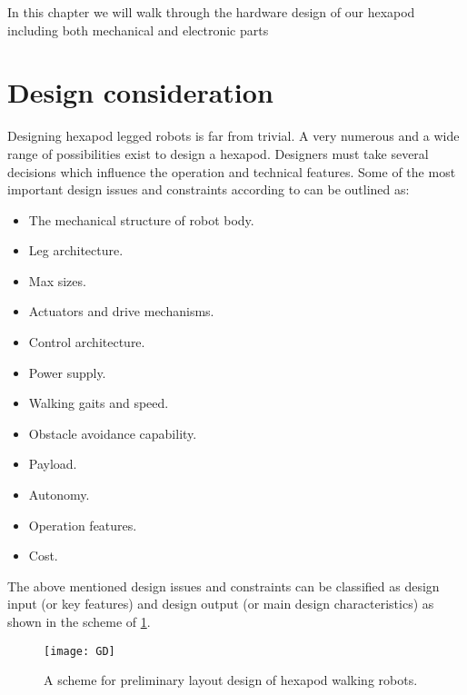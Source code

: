 
In this chapter we will walk through the hardware design of our hexapod including both mechanical and electronic parts

\section{Design consideration}
Designing hexapod legged robots is far from trivial. A very numerous and a wide range of possibilities exist to design a hexapod. Designers must take several decisions which influence the operation and technical features. Some of the most important design issues and constraints according to \cite{48h} can be outlined as:

\begin{itemize}
	\item The mechanical structure of robot body.
	\item Leg architecture.
	\item Max sizes.
	\item Actuators and drive mechanisms.
	\item Control architecture.
	\item Power supply.
	\item Walking gaits and speed.
	\item Obstacle avoidance capability.
	\item Payload.
	\item Autonomy.
	\item Operation features.
	\item Cost.
\end{itemize}

The above mentioned design issues and constraints can be classified as design input (or key	features) and design output (or main design characteristics) as shown in the scheme of \ref{GD}.

\begin{figure}[h]		
	\centering
	\texttt{[image: GD]}
    \caption{ A scheme for preliminary layout design of hexapod walking robots.}
	\label{GD}
\end{figure}


